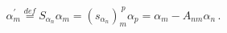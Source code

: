 \begin{equation}
  \label{weylsimple}
\alpha_m^\prime \stackrel{def}{=}
S_{\alpha_n}\alpha_m=(s_{\alpha_n})_m^{~p}\alpha_p=\alpha_m-A_{nm}
\alpha_n\, .
  \end{equation} 
